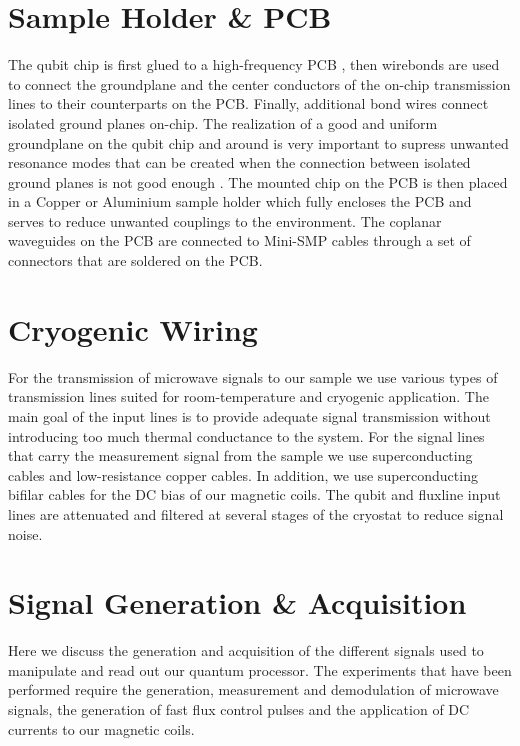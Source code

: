 \section{Sample Holder \& PCB}

The qubit chip is first glued to a high-frequency PCB , then wirebonds are used to connect the groundplane and the center conductors of the on-chip transmission lines to their counterparts on the PCB. Finally, additional bond wires connect isolated ground planes on-chip. The realization of a good and uniform groundplane on the qubit chip and around is very important to supress unwanted resonance modes that can be created when the connection between isolated ground planes is not good enough . The mounted chip on the PCB is then placed in a Copper or Aluminium sample holder which fully encloses the PCB and serves to reduce unwanted couplings to the environment. The coplanar waveguides on the PCB are connected to Mini-SMP cables through a set of connectors that are soldered on the PCB.

\section{Cryogenic Wiring}

For the transmission of microwave signals to our sample we use various types of transmission lines suited for room-temperature and cryogenic application. The main goal of the input lines is to provide adequate signal transmission without introducing too much thermal conductance to the system. For the signal lines that carry the measurement signal from the sample we use superconducting cables  and low-resistance copper cables. In addition, we use superconducting bifilar cables for the DC bias of our magnetic coils. The qubit and fluxline input lines are attenuated and filtered at several stages of the cryostat to reduce signal noise.

\section{Signal Generation \& Acquisition}

Here we discuss the generation and acquisition of the different signals used to manipulate and read out our quantum processor. The experiments that have been performed require the generation, measurement and demodulation of microwave signals, the generation of fast flux control pulses and the application of DC currents to our magnetic coils.

